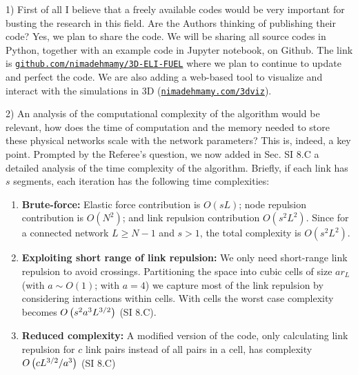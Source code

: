 \documentclass[11pt]{article}
\begin{document}
\begin{response}{
1) First of all I believe that a freely available codes would be very important for busting the research in this field. Are the Authors thinking of publishing their code?
}
Yes, we plan to share the code. 
We will be sharing 
all source codes in Python, together with an example code in Jupyter notebook, on Github. 
The link is \texttt{\href{https://github.com/nimadehmamy/3D-ELI-FUEL}{github.com/nimadehmamy/3D-ELI-FUEL}} where we plan to continue to update and perfect the code. 
We are also adding a web-based tool to visualize and interact with the simulations in 3D (\texttt{\href{http://nimadehmamy.com/3dviz}{nimadehmamy.com/3dviz}}).

\end{response}
\begin{response}{
2) An analysis of the computational complexity of the algorithm would be relevant, how does the time of computation and the memory needed to store these physical networks scale with the network parameters?
}
This is, indeed, a key point. 
Prompted by the Referee's question, we now added in Sec. SI 8.C a detailed analysis of the time complexity of the algorithm. 
Briefly, if each link has $s$ segments, each iteration has the following time complexities:
\begin{enumerate}
    \item {\bf Brute-force:}  Elastic force contribution is $O(sL)$;  node repulsion contribution is $O(N^2)$; and link repulsion contribution $O(s^2L^2)$. 
    Since for a connected network $L\geq N-1$ and $s>1$, the total complexity is $O(s^2L^2)$.  
    \item {\bf Exploiting short range of link repulsion:}
    We only need short-range link repulsion to avoid crossings. 
    Partitioning the space into cubic cells of size $ar_L$ (with $a \sim O(1)$; with $a=4$) we  capture most of the link repulsion by considering interactions within cells.
    With cells the worst case complexity becomes $O\left(s^2a^3 L^{3/2}\right)$ (SI 8.C).
    \item {\bf Reduced complexity:} 
    A modified version of the code, only calculating link repulsion for $c$ link pairs instead of all pairs in a cell, has complexity 
    $O\left(c L^{3/2}/ a^3\right)$ (SI 8.C)
\end{enumerate}


\end{response}
\end{document}

